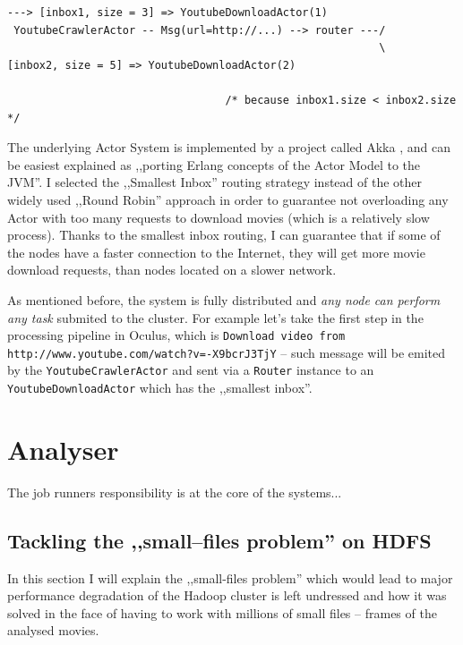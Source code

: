 \begin{lstlisting}[caption={smallest-inbox routing algorithm},label={lst:akka-router-smallest-inbox}]
                                                           ---> [inbox1, size = 3] => YoutubeDownloadActor(1)
 YoutubeCrawlerActor -- Msg(url=http://...) --> router ---/
                                                          \     [inbox2, size = 5] => YoutubeDownloadActor(2)
                                                                   
                                  /* because inbox1.size < inbox2.size */ 
\end{lstlisting}

The underlying Actor System is implemented by a project called Akka \cite{akka-docs}, and can be easiest explained as ,,porting Erlang concepts of the Actor Model to the JVM''. I selected the ,,Smallest Inbox'' routing strategy instead of the other widely used ,,Round Robin'' approach in order to guarantee not overloading any Actor with too many requests to download movies (which is a relatively slow process). Thanks to the smallest inbox routing, I can guarantee that if some of the nodes have a faster connection to the Internet, they will get more movie download requests, than nodes located on a slower network.

As mentioned before, the system is fully distributed and \textit{any node can perform any task} submited to the cluster. For example let's take the first step in the processing pipeline in Oculus, which is \verb|Download video from http://www.youtube.com/watch?v=-X9bcrJ3TjY| -- such message will be emited by the \verb|YoutubeCrawlerActor| and sent via a \verb|Router| instance to an \verb|YoutubeDownloadActor| which has the ,,smallest inbox''.


\section{Analyser}
The job runners responsibility is at the core of the systems... 

\subsection{Tackling the ,,small--files problem'' on HDFS}
In this section I will explain the ,,small-files problem'' which would lead to major performance degradation of the Hadoop cluster is left undressed and how it was solved
in the face of having to work with millions of small files -- frames of the analysed movies.

